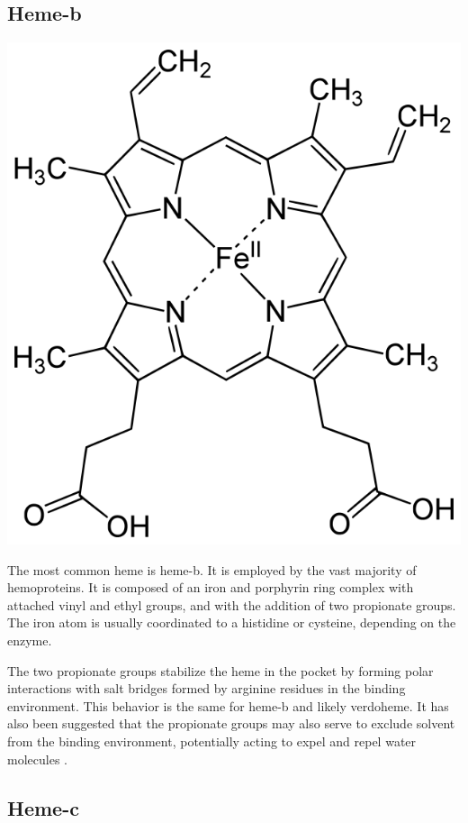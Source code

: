\documentclass[a4paper, nobind]{templates/ociamthesis}
\let\origfigure\figure
\let\endorigfigure\endfigure
\renewenvironment{figure}[1][2] {
    \expandafter\origfigure\expandafter[H]
} {
    \endorigfigure
}
\begin{document}
\hypertarget{heme-b}{%
\subsection{Heme-b}\label{heme-b}}

\begin{figure}

{\centering \includegraphics[width=0.5\linewidth]{figures/HEM} 

}

\caption{Heme-b (HEM)}\label{fig:structHEM}
\end{figure}

The most common heme is heme-b. It is employed by the vast majority of hemoproteins. It is composed of an iron and porphyrin ring complex with attached vinyl and ethyl groups, and with the addition of two propionate groups. The iron atom is usually coordinated to a histidine or cysteine, depending on the enzyme\autocite{Poulos2014,Kleingardner2015}.

The two propionate groups stabilize the heme in the pocket by forming polar interactions with salt bridges formed by arginine residues in the binding environment\autocite{Barrows2005}. This behavior is the same for heme-b and likely verdoheme. It has also been suggested that the propionate groups may also serve to exclude solvent from the binding environment, potentially acting to expel and repel water molecules \autocite{hayashi2009role}.

\hypertarget{heme-c}{%
\subsection{Heme-c}\label{heme-c}}
\end{document}
